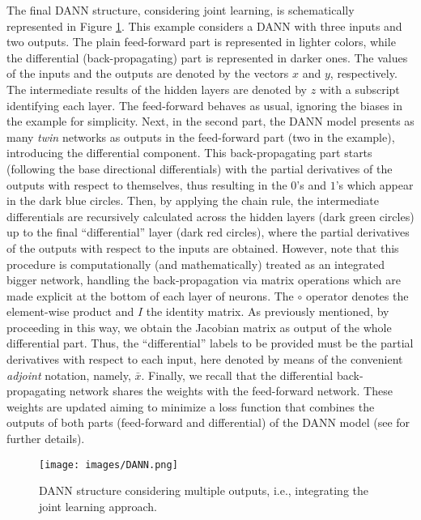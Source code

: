         The final DANN structure, considering joint learning, is schematically represented in Figure \ref{fig:DANN}. This example considers a DANN with three inputs and two outputs. The plain feed-forward part is represented in lighter colors, while the differential (back-propagating) part is represented in darker ones. The values of the inputs and the outputs are denoted by the vectors $x$ and $y$, respectively. The intermediate results of the hidden layers are denoted by $z$ with a subscript identifying each layer. The feed-forward behaves as usual, ignoring the biases in the example for simplicity. Next, in the second part, the DANN model presents as many \emph{twin} networks as outputs in the feed-forward part (two in the example), introducing the differential component. This back-propagating part starts (following the base directional differentials) with the partial derivatives of the outputs with respect to themselves, thus resulting in the $0$'s and $1$'s which appear in the dark blue circles. Then, by applying the chain rule, the intermediate differentials are recursively calculated across the hidden layers (dark green circles) up to the  final ``differential'' layer (dark red circles), where the partial derivatives of the outputs with respect to the inputs are obtained. However, note that this procedure is computationally (and mathematically) treated as an integrated bigger network, handling the back-propagation via matrix operations which are made explicit at the bottom of each layer of neurons. The $\circ$ operator denotes the element-wise product and $I$ the identity matrix. As previously mentioned, by proceeding in this way, we obtain the Jacobian matrix as output of the whole differential part. Thus, the ``differential'' labels to be provided must be the partial derivatives with respect to each input, here denoted by means of the convenient \emph{adjoint} notation, namely, $\bar{x}$. Finally, we recall that the differential back-propagating network shares the weights with the feed-forward network. These weights are updated aiming to minimize a loss function that combines the outputs of both parts (feed-forward and differential) of the DANN model (see \cite{huge2020} for further details).

        \begin{figure}[h!]
            \centering
            \texttt{[image: images/DANN.png]}
            \caption{DANN structure considering multiple outputs, i.e., integrating the joint learning approach.}
            \label{fig:DANN}
        \end{figure}
    
